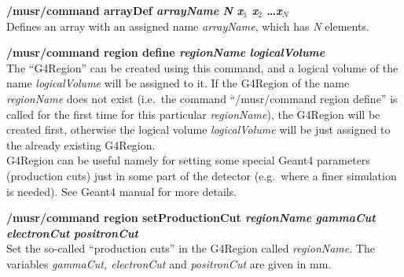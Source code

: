 \documentclass[twoside]{dis04}
\begin{document}
\begin{description}
\item{\bf /musr/command arrayDef \emph{arrayName} \emph{N} \emph{x$_1$} \emph{x$_2$} \ldots \emph{x$_N$}} \\
        Defines an array with an assigned name \emph{arrayName}, which has \emph{N} elements.

\item{\bf /musr/command region define  \emph{regionName} \emph{logicalVolume}}\\
	The ``G4Region'' can be created using this command, and a logical volume of the
	name \emph{logicalVolume} will be assigned to it.  If the G4Region of the name 
	\emph{regionName} does not exist (i.e.\ the command ``/musr/command region define''
	is called for the first time for this particular \emph{regionName}), the G4Region will
	be created first, otherwise the logical volume \emph{logicalVolume} will be just assigned
	to the already existing G4Region.  \\
	G4Region can be useful namely for setting some special Geant4 parameters (production cuts)
	just in some part of the detector (e.g.\ where a finer simulation is needed).
	See Geant4 manual for more details.

\item{\bf /musr/command region setProductionCut \emph{regionName} \emph{gammaCut} \emph{electronCut} \emph{positronCut}}\\
	Set the so-called ``production cuts'' in the G4Region called \emph{regionName}.
	The variables \emph{gammaCut, electronCut} and \emph{positronCut} are given in mm.
\end{description}


\end{document}

